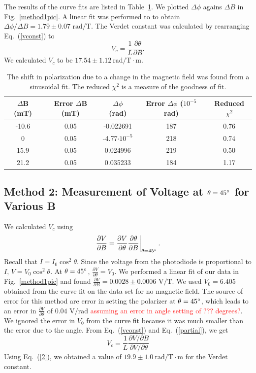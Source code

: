 \documentclass[prb,preprint]{revtex4-1}
\begin{document}
{{The results of the curve fits are listed in Table~\ref{shift table}. We plotted $\Delta \phi$ agains $\Delta B$ in Fig.~\ref{method1pic}. A linear fit was performed to to obtain $\Delta \phi/\Delta B=1.79 \pm 0.07\textrm{~rad/T}$. The Verdet constant was calculated by rearranging Eq.~(\ref{vconst}) to
\begin{equation}
V_{c} =\frac{1}{L} \frac{\partial \theta}{\partial B}. 
\end{equation}
We calculated $V_c$ to be $17.54 \pm 1.12 \mathrm{~rad/T} \cdot \textrm{m}$.
\begin{table}
    \begin{ruledtabular}
        \begin{tabular}{ccccc}
            $\Delta$B (mT)&Error $\Delta$B (mT)&$\Delta \phi$ (rad)&Error $\Delta\phi$ ($10^{-5}$ rad)&Reduced $\chi^2$ \\  \hline
            -10.6 & 0.05 & -0.022691 & 187 & 0.76 \\
            0     & 0.05 & -4.77$\cdot10^{-5}$ & 218 & 0.74 \\
            15.9  & 0.05 & 0.024996  & 219 & 0.50 \\
            21.2  & 0.05 & 0.035233  & 184 & 1.17
        \end{tabular}
    \end{ruledtabular}
\caption{\label{shift table}The shift in polarization due to a change in the magnetic field was found from a sinusoidal fit. The reduced $\chi^2$ is a measure of the goodness of fit.}
\end{table}
}


\subsection{Method 2: Measurement of Voltage at $\theta = 45\degree$ for Various B}
{We calculated $V_{c}$ using 
\begin{equation}
\label{partial}
\left. \frac{\partial V}{\partial B}=\frac{\partial V}{\partial \theta} \frac{\partial \theta}{\partial B}\right|_{\theta=45\degree}.
\end{equation}
Recall that $I=I_{0}\cos^2{\theta}$. Since the voltage from the photodiode is proportional to $I$, $V=V_{0}\cos^2{\theta}$. At $\theta = 45\degree$, $\frac{\partial V}{\partial \theta}=V_0$. 
We performed a linear fit of our data in Fig.~\ref{method1pic} and found $\frac{\partial V}{\partial B}=0.0028\pm 0.0006 \textrm{~V/T}$. We used $V_0=6.405$ obtained from the curve fit on the data set for no magnetic field. The source of error for this method are error in setting the polarizer at $\theta=45\degree$, which leads to an error in $\frac{\partial V}{\partial \theta}$ of $0.04\textrm{~V/rad}$ \textcolor{red}{assuming an error in angle setting of ??? degrees?}. We ignored the error in $V_0$ from the curve fit because it was much smaller than the error due to the angle.
From Eq.~(\ref{vconst}) and Eq.~(\ref{partial}), we get
\begin{equation}
\label{2}
V_{c} =\frac{1}{L}  \frac{\partial V/\partial B}{\partial V/\partial \theta} 
\end{equation}
Using  Eq.~(\ref{2}), we obtained a value of $19.9 \pm 1.0 \mathrm{~rad/T} \cdot \textrm{m}$ for the Verdet constant. 

}}
\end{document}
